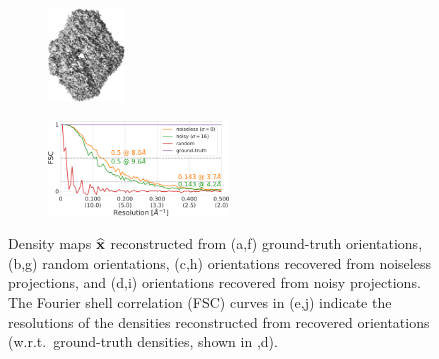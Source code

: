 \begin{figure}[t]
\begin{subfigure}[b]{0.15\linewidth}
    \end{subfigure}
    \hfill
    \begin{subfigure}[b]{0.15\linewidth}
        \centering
        \includegraphics[height=2.5cm]{figures/5a1a_quartercov_uniformS2_noise16_apr_.png}
        \caption{}\label{fig:5a1a-noise16-reconstruction-recovered}
    \end{subfigure}
    \hfill
    \begin{subfigure}[b]{0.30\linewidth}
        \centering
        \includegraphics[height=2.5cm]{figures/5a1a_quartercvg_uniformS2_noise0_FSC_apr_init_customFSC2.pdf}
        \caption{}\label{fig:5a1a-reconstruction-fsc}
    \end{subfigure}
    \caption{%
        Density maps $\widehat{\mathbf{x}}$ reconstructed from (a,f) ground-truth orientations, (b,g) random orientations, (c,h) orientations recovered from noiseless projections, and (d,i) orientations recovered from noisy projections.
        The Fourier shell correlation (FSC) curves in (e,j) indicate the resolutions of the densities reconstructed from recovered orientations (w.r.t.\ ground-truth densities, shown in ,d).
    }\label{fig:reconstructions}
\end{figure}



